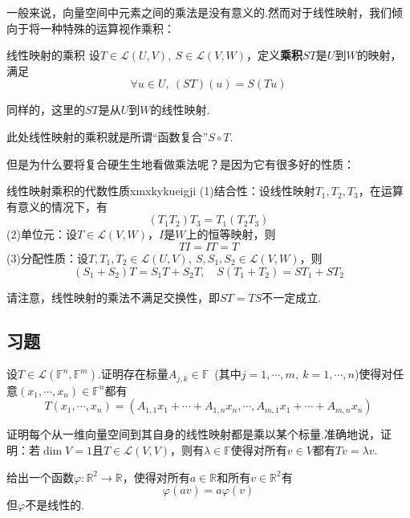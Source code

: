 \documentclass[lang=cn, zihao=5]{elegantbook}
\newcommand{\R}{\mathbb{R}}
\newcommand{\F}{\mathbb{F}}
\newcommand{\lmap}{\mathcal{L}}
\begin{document}
一般来说，向量空间中元素之间的乘法是没有意义的.然而对于线性映射，我们倾向于将一种特殊的运算视作乘积：

\begin{definition}{线性映射的乘积}
	设$T \in \lmap (U,V),~S \in \lmap (V,W)$，定义\textbf{乘积}$ST$是$U$到$W$的映射，满足$$\forall u \in U,~(ST)(u)=S(Tu)$$
\end{definition}
\begin{remark}
	同样的，这里的$ST$是从$U$到$W$的线性映射.
\end{remark}
\begin{remark}
	此处线性映射的乘积就是所谓“函数复合”$S \circ T$.
\end{remark}

但是为什么要将复合硬生生地看做乘法呢？是因为它有很多好的性质：

\begin{proposition}{线性映射乘积的代数性质}{xmxkykueigji}
	(1)结合性：设线性映射$T_1,T_2,T_3$，在运算有意义的情况下，有$$(T_1T_2)T_3=T_1(T_2T_3)$$
	(2)单位元：设$T \in \lmap (V,W)$，$I$是$W$上的恒等映射，则$$TI=IT=T$$
	(3)分配性质：设$T,T_1,T_2 \in \lmap (U,V),~S,S_1,S_2 \in \lmap (V,W)$，则$$(S_1+S_2)T=S_1T+S_2T,\quad S(T_1+T_2)=ST_1+ST_2$$
\end{proposition}

请注意，线性映射的乘法不满足交换性，即$ST=TS$不一定成立.

\subsection*{习题}

\begin{exercise}
	设$T \in \lmap (\F ^n,\F ^m)$.证明存在标量$A_{j,k} \in \F$~(其中$j=1, \cdots ,m,~k=1,\cdots ,n$)使得对任意$(x_1, \cdots ,x_n) \in \F ^n$都有$$T(x_1, \cdots ,x_n) = (A_{1,1}x_1+ \cdots +A_{1,n}x_n, \cdots ,A_{m,1}x_1+\cdots +A_{m,n}x_n)$$
\end{exercise}

\begin{exercise}
	证明每个从一维向量空间到其自身的线性映射都是乘以某个标量.准确地说，证明：若$\dim V=1$且$T \in \lmap (V,V)$，则有$\lambda \in \F$使得对所有$v \in V$都有$Tv=\lambda v$.
\end{exercise}

\begin{exercise}
	给出一个函数$\varphi :\R ^2 \to \R$，使得对所有$a \in \R$和所有$v \in \R ^2$有$$\varphi (av)=a\varphi (v)$$
	但$\varphi$不是线性的.
\end{exercise}
\end{document}
